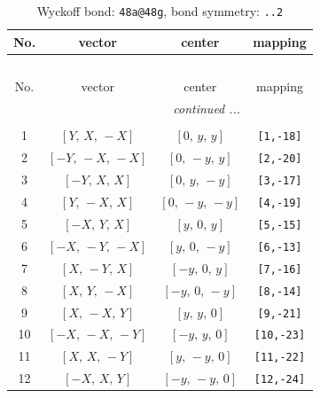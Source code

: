 \documentclass[fleqn,8pt]{jsarticle}
\begin{document}
\begin{longtable}{cccc}
\caption{Wyckoff bond: {\tt 48a@48g}, bond symmetry: {\tt ..2}}
 \\
 \hline \hline
No. & vector & center & mapping \\ \hline \endfirsthead

\multicolumn{3}{l}{\tablename\ \thetable{}} \\
 \hline \hline
No. & vector & center & mapping \\ \hline \endhead

 \hline \hline
\multicolumn{3}{r}{\footnotesize\it continued ...} \\ \endfoot

 \hline \hline
\multicolumn{3}{r}{} \\ \endlastfoot

1 & $\left[ Y,\, X,\, - X \right]$ & $\left[ 0,\, y,\, y \right]$ & {\tt [1,-18]} \\ \hline
2 & $\left[ - Y,\, - X,\, - X \right]$ & $\left[ 0,\, - y,\, y \right]$ & {\tt [2,-20]} \\ \hline
3 & $\left[ - Y,\, X,\, X \right]$ & $\left[ 0,\, y,\, - y \right]$ & {\tt [3,-17]} \\ \hline
4 & $\left[ Y,\, - X,\, X \right]$ & $\left[ 0,\, - y,\, - y \right]$ & {\tt [4,-19]} \\ \hline
5 & $\left[ - X,\, Y,\, X \right]$ & $\left[ y,\, 0,\, y \right]$ & {\tt [5,-15]} \\ \hline
6 & $\left[ - X,\, - Y,\, - X \right]$ & $\left[ y,\, 0,\, - y \right]$ & {\tt [6,-13]} \\ \hline
7 & $\left[ X,\, - Y,\, X \right]$ & $\left[ - y,\, 0,\, y \right]$ & {\tt [7,-16]} \\ \hline
8 & $\left[ X,\, Y,\, - X \right]$ & $\left[ - y,\, 0,\, - y \right]$ & {\tt [8,-14]} \\ \hline
9 & $\left[ X,\, - X,\, Y \right]$ & $\left[ y,\, y,\, 0 \right]$ & {\tt [9,-21]} \\ \hline
10 & $\left[ - X,\, - X,\, - Y \right]$ & $\left[ - y,\, y,\, 0 \right]$ & {\tt [10,-23]} \\ \hline
11 & $\left[ X,\, X,\, - Y \right]$ & $\left[ y,\, - y,\, 0 \right]$ & {\tt [11,-22]} \\ \hline
12 & $\left[ - X,\, X,\, Y \right]$ & $\left[ - y,\, - y,\, 0 \right]$ & {\tt [12,-24]} \\
\end{longtable}
\renewcommand{\arraystretch}{1.2}
\end{document}
